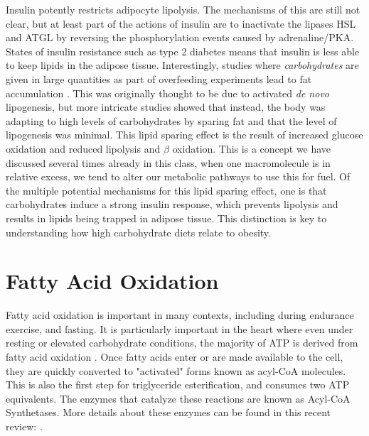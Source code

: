 \documentclass{tufte-handout}
\begin{document}
Insulin potently restricts adipocyte lipolysis.  The mechanisms of this are still not clear, but at least part of the actions of insulin are to inactivate the lipases HSL and ATGL by reversing the phosphorylation events caused by adrenaline/PKA.   States of insulin resistance such as type 2 diabetes means that insulin is less able to keep lipids in the adipose tissue.  Interestingly, studies where \emph{carbohydrates} are given in large quantities as part of overfeeding experiments lead to fat accumulation \citep{Acheson1988}.  This was originally thought to be due to activated \textit{de novo} lipogenesis, but more intricate studies showed that instead, the body was adapting to high levels of carbohydrates by sparing fat \citep{McDevitt2001} and that the level of lipogenesis was minimal.  This lipid sparing effect is the result of increased glucose oxidation and reduced lipolysis and $\beta$ oxidation.  This is a concept we have discussed several times already in this class, when one macromolecule is in relative excess, we tend to alter our metabolic pathways to use this for fuel.  Of the multiple potential mechanisms for this lipid sparing effect, one is that carbohydrates induce a strong insulin response, which prevents lipolysis and results in lipids being trapped in adipose tissue.  This distinction is key to understanding how high carbohydrate diets relate to obesity.

\section{Fatty Acid Oxidation}

Fatty acid oxidation is important in many contexts, including during endurance exercise, and fasting.  It is particularly important in the heart where even under resting or elevated carbohydrate conditions, the majority of ATP is derived from fatty acid oxidation \citep{Neeley1974}.  Once fatty acids enter or are made available to the cell, they are quickly converted to "activated" forms known as acyl-CoA molecules.  This is also the first step for triglyceride esterification, and consumes two ATP equivalents.  The enzymes that catalyze these reactions are known as Acyl-CoA Synthetases.  More details about these enzymes can be found in this recent review: \citep{Grevengoed2014}.
\end{document}

